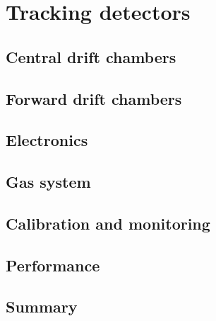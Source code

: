\section{Tracking detectors \label{sec:tracking}}
\subsection[Central drift chambers (Naomi)]{Central drift chambers \label{sec:cdc}}
\subsection{Forward drift chambers \label{sec:fdc}}
\subsection{Electronics \label{sec:dcelectronics}}
\subsection[Gas system (Beni)]{Gas system \label{sec:gas}}
\subsection{Calibration and monitoring \label{sec:dccalib}}
\subsection{Performance \label{sec:dcperformance}}
\subsection{Summary \label{sec:dcsummary}}
 
